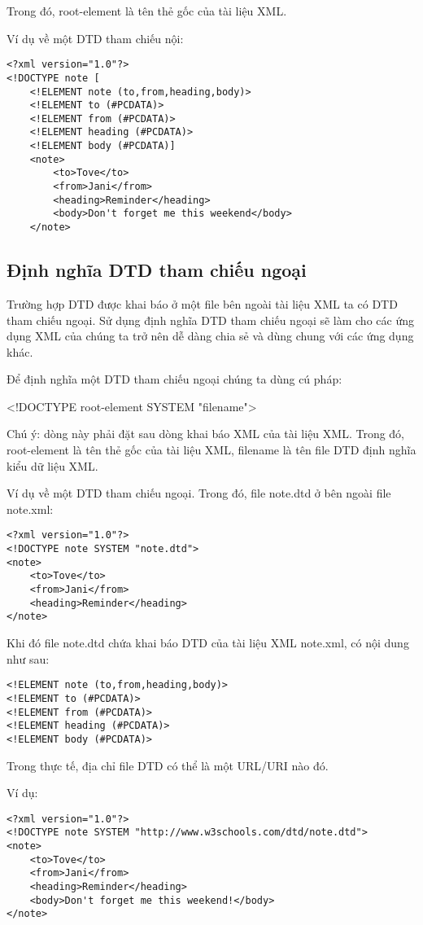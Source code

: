 Trong đó,  {\ttfamily root-element} là tên thẻ gốc của tài liệu XML.

Ví dụ về một DTD tham chiếu nội:
\lstset{language=XML}
\begin{lstlisting}
<?xml version="1.0"?>
<!DOCTYPE note [
    <!ELEMENT note (to,from,heading,body)> 
    <!ELEMENT to (#PCDATA)> 
    <!ELEMENT from (#PCDATA)> 
    <!ELEMENT heading (#PCDATA)> 
    <!ELEMENT body (#PCDATA)]
    <note>
    	<to>Tove</to>
		<from>Jani</from>
		<heading>Reminder</heading>
		<body>Don't forget me this weekend</body> 
    </note> 
\end{lstlisting}
\subsection{ Định nghĩa DTD tham chiếu ngoại}
 
Trường hợp DTD được khai báo ở một file bên ngoài tài liệu XML ta có DTD tham chiếu ngoại. Sử dụng định nghĩa DTD tham chiếu ngoại sẽ làm cho các ứng dụng XML của chúng ta trở nên dễ dàng chia sẻ và dùng chung với các ứng dụng khác.
 
 Để định nghĩa một DTD tham chiếu ngoại chúng ta dùng cú pháp:
\begin{center}
{ \ttfamily <!DOCTYPE root-element  SYSTEM "filename">} 
\end{center}

Chú ý: dòng này phải đặt sau dòng khai báo XML của tài liệu XML. Trong đó, root-element là tên thẻ gốc của tài liệu XML, filename là tên file DTD định nghĩa kiểu dữ liệu XML.
 
Ví dụ về một DTD tham chiếu ngoại. Trong đó, file note.dtd ở bên ngoài file note.xml:
\lstset{language=XML}
\begin{lstlisting}
<?xml version="1.0"?>
<!DOCTYPE note SYSTEM "note.dtd">
<note>
	<to>Tove</to>
	<from>Jani</from>
	<heading>Reminder</heading>
</note>
\end{lstlisting}

Khi đó file note.dtd chứa khai báo DTD của tài liệu XML note.xml, có nội dung như sau:
\lstset{language=XML}
\begin{lstlisting}
<!ELEMENT note (to,from,heading,body)>
<!ELEMENT to (#PCDATA)>
<!ELEMENT from (#PCDATA)>
<!ELEMENT heading (#PCDATA)>
<!ELEMENT body (#PCDATA)>
\end{lstlisting}

Trong thực tế, địa chỉ file DTD có thể là một URL/URI nào đó.

Ví dụ:
\begin{lstlisting}
<?xml version="1.0"?>
<!DOCTYPE note SYSTEM "http://www.w3schools.com/dtd/note.dtd">
<note>
	<to>Tove</to>
	<from>Jani</from>
	<heading>Reminder</heading>
	<body>Don't forget me this weekend!</body>
</note>
\end{lstlisting}
  
